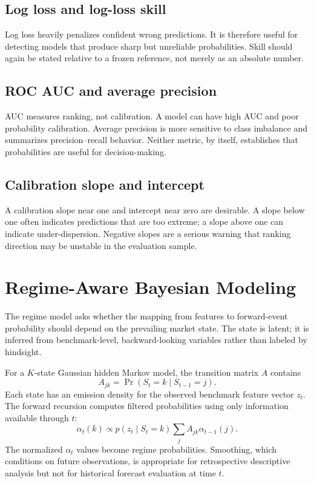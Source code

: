 \documentclass[11pt]{article}
\begin{document}
\subsection{Log loss and log-loss skill}
Log loss heavily penalizes confident wrong predictions. It is therefore useful for detecting models that produce sharp but unreliable probabilities. Skill should again be stated relative to a frozen reference, not merely as an absolute number.

\subsection{ROC AUC and average precision}
AUC measures ranking, not calibration. A model can have high AUC and poor probability calibration. Average precision is more sensitive to class imbalance and summarizes precision--recall behavior. Neither metric, by itself, establishes that probabilities are useful for decision-making.

\subsection{Calibration slope and intercept}
A calibration slope near one and intercept near zero are desirable. A slope below one often indicates predictions that are too extreme; a slope above one can indicate under-dispersion. Negative slopes are a serious warning that ranking direction may be unstable in the evaluation sample.

\section{Regime-Aware Bayesian Modeling}
The regime model asks whether the mapping from features to forward-event probability should depend on the prevailing market state. The state is latent; it is inferred from benchmark-level, backward-looking variables rather than labeled by hindsight.

For a $K$-state Gaussian hidden Markov model, the transition matrix $A$ contains
\begin{equation}
A_{jk}=\Pr(S_t=k\mid S_{t-1}=j).
\end{equation}
Each state has an emission density for the observed benchmark feature vector $z_t$. The forward recursion computes filtered probabilities using only information available through $t$:
\begin{equation}
\alpha_t(k)\propto p(z_t\mid S_t=k)\sum_j A_{jk}\alpha_{t-1}(j).
\end{equation}
The normalized $\alpha_t$ values become regime probabilities. Smoothing, which conditions on future observations, is appropriate for retrospective descriptive analysis but not for historical forecast evaluation at time $t$.
\end{document}
